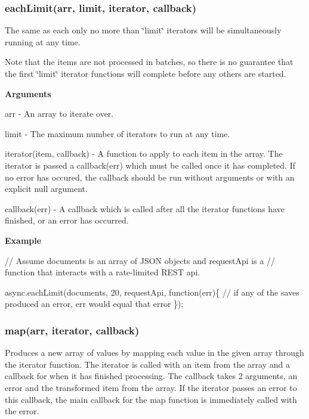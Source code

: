 \label{_forEachLimit}%
 \label{_eachLimit}%
 \subsubsection*{each\+Limit(arr, limit, iterator, callback)}

The same as each only no more than \char`\"{}limit\char`\"{} iterators will be simultaneously running at any time.

Note that the items are not processed in batches, so there is no guarantee that the first \char`\"{}limit\char`\"{} iterator functions will complete before any others are started.

{\bfseries Arguments}


\begin{DoxyItemize}
\item arr -\/ An array to iterate over.
\item limit -\/ The maximum number of iterators to run at any time.
\item iterator(item, callback) -\/ A function to apply to each item in the array. The iterator is passed a callback(err) which must be called once it has completed. If no error has occured, the callback should be run without arguments or with an explicit null argument.
\item callback(err) -\/ A callback which is called after all the iterator functions have finished, or an error has occurred.
\end{DoxyItemize}

{\bfseries Example}


\begin{DoxyCode}
\textcolor{comment}{// Assume documents is an array of JSON objects and requestApi is a}
\textcolor{comment}{// function that interacts with a rate-limited REST api.}

async.eachLimit(documents, 20, requestApi, \textcolor{keyword}{function}(err)\{
    \textcolor{comment}{// if any of the saves produced an error, err would equal that error}
\});
\end{DoxyCode}
 



\label{_map}%
 \subsubsection*{map(arr, iterator, callback)}

Produces a new array of values by mapping each value in the given array through the iterator function. The iterator is called with an item from the array and a callback for when it has finished processing. The callback takes 2 arguments, an error and the transformed item from the array. If the iterator passes an error to this callback, the main callback for the map function is immediately called with the error.

